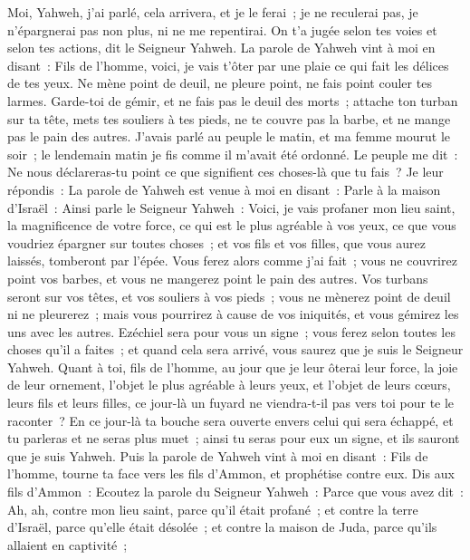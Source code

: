 \begin{multicols}{2}
Moi, Yahweh, j'ai parlé, cela arrivera, et je le ferai~; je ne reculerai pas, je n'épargnerai pas non plus, ni ne me repentirai. On t'a jugée selon tes voies et selon tes actions, dit le Seigneur Yahweh.
La parole de Yahweh vint à moi en disant~:
Fils de l'homme, voici, je vais t'ôter par une plaie ce qui fait les délices de tes yeux. Ne mène point de deuil, ne pleure point, ne fais point couler tes larmes.
Garde-toi de gémir, et ne fais pas le deuil des morts~; attache ton turban sur ta tête, mets tes souliers à tes pieds, ne te couvre pas la barbe, et ne mange pas le pain des autres.
J'avais parlé au peuple le matin, et ma femme mourut le soir~; le lendemain matin je fis comme il m'avait été ordonné.
Le peuple me dit~: Ne nous déclareras-tu point ce que signifient ces choses-là que tu fais~?
Je leur répondis~: La parole de Yahweh est venue à moi en disant~:
Parle à la maison d'Israël~: Ainsi parle le Seigneur Yahweh~: Voici, je vais profaner mon lieu saint, la magnificence de votre force, ce qui est le plus agréable à vos yeux, ce que vous voudriez épargner sur toutes choses~; et vos fils et vos filles, que vous aurez laissés, tomberont par l'épée.
Vous ferez alors comme j'ai fait~; vous ne couvrirez point vos barbes, et vous ne mangerez point le pain des autres.
Vos turbans seront sur vos têtes, et vos souliers à vos pieds~; vous ne mènerez point de deuil ni ne pleurerez~; mais vous pourrirez à cause de vos iniquités, et vous gémirez les uns avec les autres. Ezéchiel sera pour vous un signe~;
vous ferez selon toutes les choses qu'il a faites~; et quand cela sera arrivé, vous saurez que je suis le Seigneur Yahweh.
Quant à toi, fils de l'homme, au jour que je leur ôterai leur force, la joie de leur ornement, l'objet le plus agréable à leurs yeux, et l'objet de leurs cœurs, leurs fils et leurs filles,
ce jour-là un fuyard ne viendra-t-il pas vers toi pour te le raconter~?
En ce jour-là ta bouche sera ouverte envers celui qui sera échappé, et tu parleras et ne seras plus muet~; ainsi tu seras pour eux un signe, et ils sauront que je suis Yahweh.
\VerseOne{}Puis la parole de Yahweh vint à moi en disant~:
Fils de l'homme, tourne ta face vers les fils d'Ammon, et prophétise contre eux.
Dis aux fils d'Ammon~: Ecoutez la parole du Seigneur Yahweh~: Parce que vous avez dit~: Ah, ah, contre mon lieu saint, parce qu'il était profané~; et contre la terre d'Israël, parce qu'elle était désolée~; et contre la maison de Juda, parce qu'ils allaient en captivité~;

\end{multicols}
